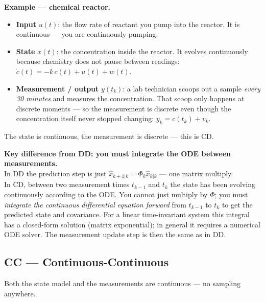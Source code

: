 \documentclass[12pt, a4paper]{article}
\begin{document}
\begin{notebox}
  \textbf{Example --- chemical reactor.}\\
  \begin{itemize}[leftmargin=1.4em, topsep=2pt]
    \item \textbf{Input} $u(t)$: the flow rate of reactant you pump
          into the reactor.
          It is continuous --- you are continuously pumping.
    \item \textbf{State} $x(t)$: the concentration inside the
          reactor.
          It evolves continuously because chemistry does not pause
          between readings:
          $\dot{c}(t) = -k\,c(t) + u(t) + w(t)$.
    \item \textbf{Measurement / output} $y(t_k)$: a lab technician
          scoops out a sample \emph{every 30 minutes} and measures
          the concentration.
          That scoop only happens at discrete moments --- so the
          measurement is discrete even though the concentration
          itself never stopped changing:
          $y_k = c(t_k) + v_k$.
  \end{itemize}
  The state is continuous, the measurement is discrete --- this is
  CD.
\end{notebox}

\begin{warnbox}
  \textbf{Key difference from DD: you must integrate the ODE
  between measurements.}\\
  In DD the prediction step is just $\hat{x}_{k+1|k} =
  \Phi_k \hat{x}_{k|k}$ --- one matrix multiply.\\
  In CD, between two measurement times $t_{k-1}$ and $t_k$ the
  state has been evolving continuously according to the ODE.
  You cannot just multiply by $\Phi$; you must \emph{integrate the
  continuous differential equation forward} from $t_{k-1}$ to $t_k$
  to get the predicted state and covariance.
  For a linear time-invariant system this integral has a closed-form
  solution (matrix exponential); in general it requires a numerical
  ODE solver.
  The measurement update step is then the same as in DD.
\end{warnbox}

\subsection*{CC --- Continuous-Continuous}

Both the state model and the measurements are continuous ---
no sampling anywhere.
\end{document}

